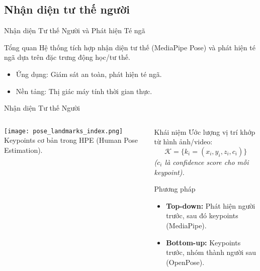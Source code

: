 \subsection{Nhận diện tư thế người}
\begin{frame}{Nhận diện Tư thế Người và Phát hiện Té ngã}
    \begin{block}{Tổng quan}
        Hệ thống tích hợp nhận diện tư thế (MediaPipe Pose) và phát hiện té ngã dựa trên đặc trưng động học/tư thế.
        \begin{itemize}
            \item Ứng dụng: Giám sát an toàn, phát hiện té ngã.
            \item Nền tảng: Thị giác máy tính thời gian thực.
        \end{itemize}
    \end{block}
\end{frame}

\begin{frame}{Nhận diện Tư thế Người}
\begin{columns}[T]
    \begin{column}{0.45\textwidth}
        \centering
        \texttt{[image: pose\_landmarks\_index.png]}
        \vspace{0.2cm}
        {\small Keypoints cơ bản trong HPE (Human Pose Estimation).}
    \end{column}

    \begin{column}{0.55\textwidth}
        \begin{block}{Khái niệm}
            Ước lượng vị trí khớp từ hình ảnh/video:
            \[
                \mathcal{K} = \{k_i = (x_i, y_i, z_i, c_i)\}
            \]
            \small{\textit{($c_i$ là confidence score cho mỗi keypoint).}}
        \end{block}

        \begin{alertblock}{Phương pháp}
            \begin{itemize}
                \item \textbf{Top-down:} Phát hiện người trước, sau đó keypoints (MediaPipe).
                \item \textbf{Bottom-up:} Keypoints trước, nhóm thành người sau (OpenPose).
            \end{itemize}
        \end{alertblock}
    \end{column}
\end{columns}
\end{frame}

